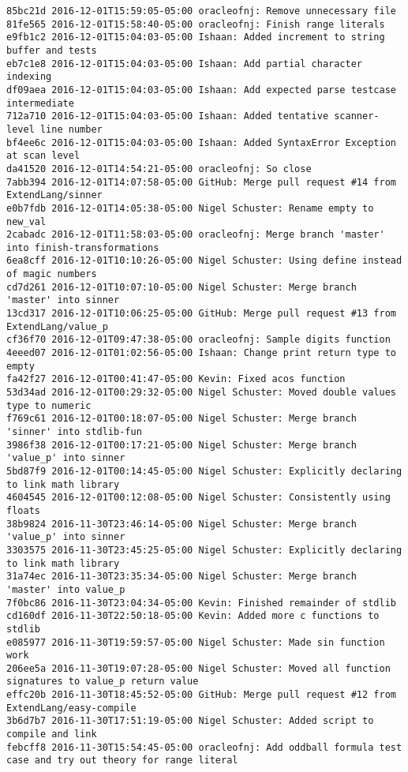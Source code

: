 \begin{lstlisting}
85bc21d 2016-12-01T15:59:05-05:00 oracleofnj: Remove unnecessary file
81fe565 2016-12-01T15:58:40-05:00 oracleofnj: Finish range literals
e9fb1c2 2016-12-01T15:04:03-05:00 Ishaan: Added increment to string buffer and tests
eb7c1e8 2016-12-01T15:04:03-05:00 Ishaan: Add partial character indexing
df09aea 2016-12-01T15:04:03-05:00 Ishaan: Add expected parse testcase intermediate
712a710 2016-12-01T15:04:03-05:00 Ishaan: Added tentative scanner-level line number
bf4ee6c 2016-12-01T15:04:03-05:00 Ishaan: Added SyntaxError Exception at scan level
da41520 2016-12-01T14:54:21-05:00 oracleofnj: So close
7abb394 2016-12-01T14:07:58-05:00 GitHub: Merge pull request #14 from ExtendLang/sinner
e0b7fdb 2016-12-01T14:05:38-05:00 Nigel Schuster: Rename empty to new_val
2cabadc 2016-12-01T11:58:03-05:00 oracleofnj: Merge branch 'master' into finish-transformations
6ea8cff 2016-12-01T10:10:26-05:00 Nigel Schuster: Using define instead of magic numbers
cd7d261 2016-12-01T10:07:10-05:00 Nigel Schuster: Merge branch 'master' into sinner
13cd317 2016-12-01T10:06:25-05:00 GitHub: Merge pull request #13 from ExtendLang/value_p
cf36f70 2016-12-01T09:47:38-05:00 oracleofnj: Sample digits function
4eeed07 2016-12-01T01:02:56-05:00 Ishaan: Change print return type to empty
fa42f27 2016-12-01T00:41:47-05:00 Kevin: Fixed acos function
53d34ad 2016-12-01T00:29:32-05:00 Nigel Schuster: Moved double values type to numeric
f769c61 2016-12-01T00:18:07-05:00 Nigel Schuster: Merge branch 'sinner' into stdlib-fun
3986f38 2016-12-01T00:17:21-05:00 Nigel Schuster: Merge branch 'value_p' into sinner
5bd87f9 2016-12-01T00:14:45-05:00 Nigel Schuster: Explicitly declaring to link math library
4604545 2016-12-01T00:12:08-05:00 Nigel Schuster: Consistently using floats
38b9824 2016-11-30T23:46:14-05:00 Nigel Schuster: Merge branch 'value_p' into sinner
3303575 2016-11-30T23:45:25-05:00 Nigel Schuster: Explicitly declaring to link math library
31a74ec 2016-11-30T23:35:34-05:00 Nigel Schuster: Merge branch 'master' into value_p
7f0bc86 2016-11-30T23:04:34-05:00 Kevin: Finished remainder of stdlib
cd160df 2016-11-30T22:50:18-05:00 Kevin: Added more c functions to stdlib
e085977 2016-11-30T19:59:57-05:00 Nigel Schuster: Made sin function work
206ee5a 2016-11-30T19:07:28-05:00 Nigel Schuster: Moved all function signatures to value_p return value
effc20b 2016-11-30T18:45:52-05:00 GitHub: Merge pull request #12 from ExtendLang/easy-compile
3b6d7b7 2016-11-30T17:51:19-05:00 Nigel Schuster: Added script to compile and link
febcff8 2016-11-30T15:54:45-05:00 oracleofnj: Add oddball formula test case and try out theory for range literal

\end{lstlisting}
